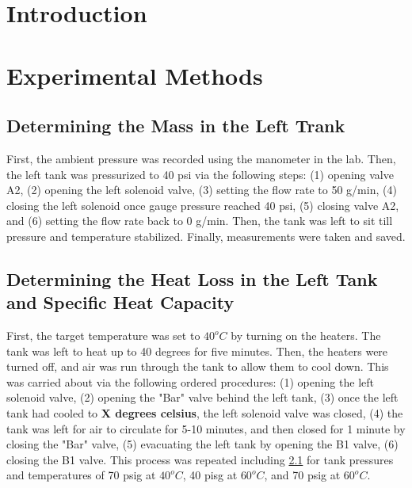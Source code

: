 \documentclass{article} %
\begin{document}
\begin{multicols}{2}

\section{Introduction}
\label{introduction}

\section{Experimental Methods}
\label{experimental_methods}

\subsection{Determining the Mass in the Left Trank}
\label{methods_path_independencies_thermodynamic_properties}

First, the ambient pressure was recorded using the manometer in the lab.
Then, the left tank was pressurized to 40 psi via the following steps:
(1) opening valve A2, (2) opening the left solenoid valve, (3) setting the flow rate to 50 g/min, (4) closing the left solenoid once gauge pressure reached 40 psi, (5) closing valve A2, and (6) setting the flow rate back to 0 g/min.
Then, the tank was left to sit till pressure and temperature stabilized.
Finally, measurements were taken and saved.

\subsection{Determining the Heat Loss in the Left Tank and Specific Heat Capacity}
\label{methods_initial_mass_volume_left_tank}

First, the target temperature was set to $40^{o}C$ by turning on the heaters.
The tank was left to heat up to 40 degrees for five minutes.
Then, the heaters were turned off, and air was run through the tank to allow them to cool down.
This was carried about via the following ordered procedures:
(1) opening the left solenoid valve, (2) opening the "Bar" valve behind the left tank, (3) once the left tank had cooled to \textbf{X degrees celsius}, the left solenoid valve was closed,
(4) the tank was left for air to circulate for 5-10 minutes, and then closed for 1 minute by closing the "Bar" valve, (5) evacuating the left tank by opening the B1 valve, (6) closing the B1 valve.
This process was repeated including \ref{methods_path_independencies_thermodynamic_properties} for tank pressures and temperatures of 70 psig at $40^{o}C$, 40 pisg at $60^{o}C$, and 70 psig at $60^{o}C$.


\end{multicols}
\end{document}
